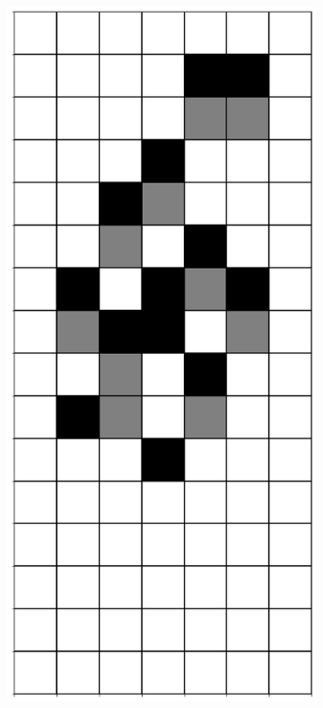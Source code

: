 \documentclass[12pt]{article}
\numberwithin{figure}{section} %
\begin{document}
\begin{figure}[H]
\begin{subfigure}{0.18\textwidth}
     		\subcaption{}
   	\end{subfigure}
        	\begin{subfigure}{0.18\textwidth}
     		\centering
     		\includegraphics[width=\linewidth]{Section4/19.4}
     		\subcaption{}
   	\end{subfigure}
      	\newline
   	\setcounter{subfigure}{0}
   

\end{figure}
\end{document}
